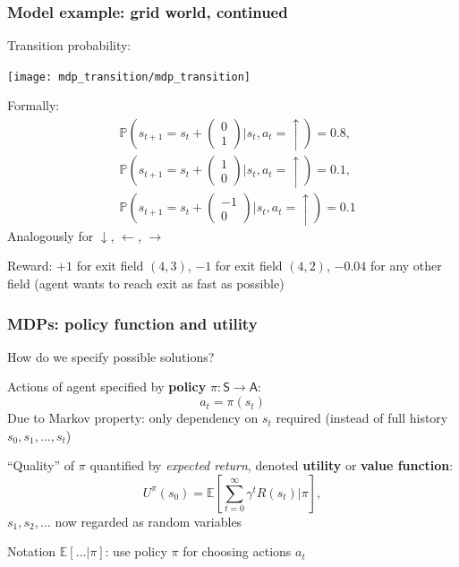 \documentclass[t]{beamer}
\begin{document}
\begin{frame}
\frametitle{Model example: grid world, continued}
Transition probability:
\begin{center}
\texttt{[image: mdp\_transition/mdp\_transition]}
\end{center}
Formally:
\begin{align*}
&\mathbb{P}\left( s_{t+1} = s_t + \left(\begin{smallmatrix} 0\\1\end{smallmatrix}\right) \vert s_t, a_t = \uparrow \right) = 0.8, \\
&\mathbb{P}\left( s_{t+1} = s_t + \left(\begin{smallmatrix} 1\\0\end{smallmatrix}\right) \vert s_t, a_t = \uparrow \right) = 0.1, \\
&\mathbb{P}\left( s_{t+1} = s_t + \left(\begin{smallmatrix}-1\\0\end{smallmatrix}\right) \vert s_t, a_t = \uparrow \right) = 0.1
\end{align*}
Analogously for $\downarrow$, $\leftarrow$, $\rightarrow$

Reward: $+1$ for exit field $(4,3)$, $-1$ for exit field $(4,2)$, $-0.04$ for any other field (agent wants to reach exit as fast as possible)
\end{frame}



\begin{frame}
\frametitle{MDPs: policy function and utility}
How do we specify possible solutions?

Actions of agent specified by \textbf{policy} $\pi: \mathsf{S} \to \mathsf{A}$:
\[
a_t = \pi( s_t )
\]
Due to Markov property: only dependency on $s_t$ required (instead of full history $s_0, s_1, \dots, s_t$)

\pause

``Quality'' of $\pi$ quantified by \emph{expected return}, denoted \textbf{utility} or \textbf{value function}:
\[
U^\pi(s_0) = \mathbb{E}\!\left[ \sum_{t=0}^\infty \gamma^t R(s_t) \Big\vert \pi \right],
\]
$s_1, s_2, \dots$ now regarded as random variables

Notation $\mathbb{E}[\dots \vert \pi]$: use policy $\pi$ for choosing actions $a_t$
\end{frame}
\end{document}
